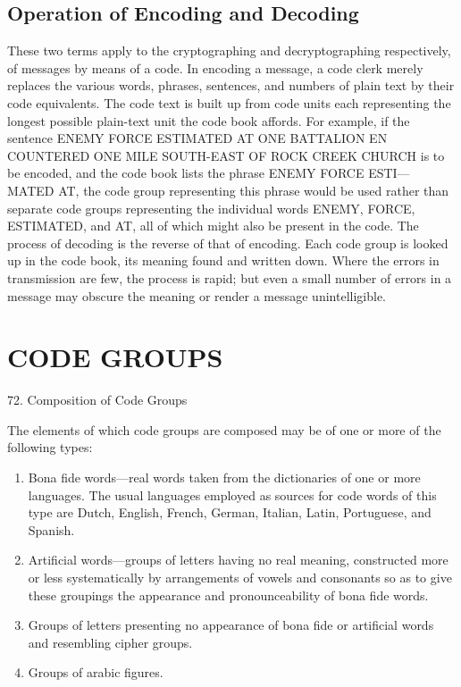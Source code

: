 \subsection{Operation of Encoding and Decoding}

These two terms apply to the cryptographing and decryptographing
respectively, of messages by means of a code. In encoding a message, a
code clerk merely replaces the various words, phrases, sentences, and
numbers of plain text by their code equivalents. The code text is built
up from code units each representing the longest possible plain-text unit
the code book affords. For example, if the sentence ENEMY FORCE
ESTIMATED AT ONE BATTALION EN COUNTERED ONE
MILE SOUTH-EAST OF ROCK CREEK CHURCH is to be
encoded, and the code book lists the phrase ENEMY FORCE ESTI—
MATED AT, the code group representing this phrase would be used
rather than separate code groups representing the individual words
ENEMY, FORCE, ESTIMATED, and AT, all of which might also
be present in the code. The process of decoding is the reverse of that
of encoding. Each code group is looked up in the code book, its meaning
found and written down. Where the errors in transmission are few, the
process is rapid; but even a small number of errors in a message may
obscure the meaning or render a message unintelligible.

\section{CODE GROUPS}

72. Composition of Code Groups

\mypara The elements of which code groups are composed may be of one or
more of the following types:
\begin{enumerate}

\item Bona ﬁde words—real words taken from the dictionaries of one
or more languages. The usual languages employed as sources
for code words of this type are Dutch, English, French,
German, Italian, Latin, Portuguese, and Spanish.

\item Artiﬁcial words—groups of letters having no real meaning,
constructed more or less systematically by arrangements of
vowels and consonants so as to give these groupings the appearance and pronounceability of bona ﬁde words.

\item Groups of letters presenting no appearance of bona ﬁde or artiﬁcial words and resembling cipher groups.

\item Groups of arabic ﬁgures.
\end{enumerate}

